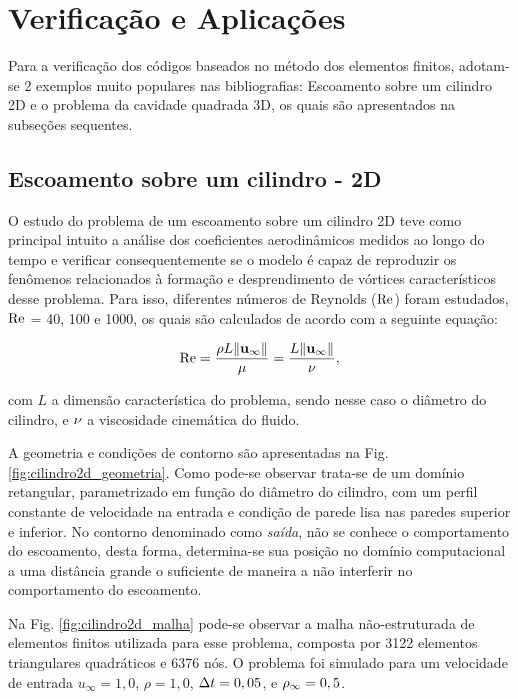 \documentclass[tese_patricia]{subfiles}%
\begin{document}
\section{Verificação e Aplicações}

Para a verificação dos códigos baseados no método dos elementos finitos, adotam-se 2 exemplos muito populares nas bibliografias: Escoamento sobre um cilindro 2D e o problema da cavidade quadrada 3D, os quais são apresentados na subseções sequentes.

\subsection{Escoamento sobre um cilindro - 2D} \label{subsection:escoamentocil2d}

O estudo do problema de um escoamento sobre um cilindro 2D teve como principal intuito a análise dos coeficientes aerodinâmicos medidos ao longo do tempo e verificar consequentemente se o modelo é capaz de reproduzir os fenômenos relacionados à formação e desprendimento de vórtices característicos desse problema. Para isso, diferentes números de Reynolds ($\mathrm{Re}$) foram estudados, $\mathrm{Re}$ = 40, 100 e 1000, os quais são calculados de acordo com a seguinte equação:

\begin{align}
	\mathrm{Re} = \frac{\rho L \lVert\mathbf{u}_{\infty}\lVert}{\mu} = \frac{L \lVert \mathbf{u}_{\infty} \lVert}{\nu}, \label{eq:Reynolds}
\end{align}

\noindent com $L$ a dimensão característica do problema, sendo nesse caso o diâmetro do cilindro, e $\nu$ a viscosidade cinemática do fluido. 

A geometria e condições de contorno são apresentadas na Fig. \ref{fig:cilindro2d_geometria}. Como pode-se observar trata-se de um domínio retangular, parametrizado em função do diâmetro do cilindro, com um perfil constante de velocidade na entrada e condição de parede lisa nas paredes superior e inferior. No contorno denominado como \textit{saída}, não se conhece o comportamento do escoamento, desta forma, determina-se sua posição no domínio computacional a uma distância grande o suficiente de maneira a não interferir no comportamento do escoamento. 

Na Fig. \ref{fig:cilindro2d_malha} pode-se observar a malha não-estruturada de elementos finitos utilizada para esse problema, composta por 3122 elementos triangulares quadráticos e 6376 nós. O problema foi simulado para um velocidade de entrada $u_{\infty} = 1,0$, $\rho = 1,0$, $\Delta t = 0,05$, e $\rho_\infty = 0,5$. 
\end{document}
